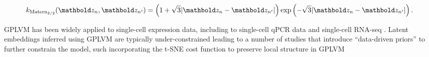 \begin{equation}
  k_{\text{Matern}_{3/2}}(\mbz_n, \mbz_{n'}) =
  \left(
  1 + \sqrt{3} \lvert \mbz_n - \mbz_{n'} \rvert \right) \exp\left( - \sqrt{3} \lvert \mbz_n - \mbz_{n'} \rvert \right).
\end{equation}

GPLVM has been widely applied to single-cell expression data, including to single-cell qPCR data \cite{buettner2012novel} and single-cell RNA-seq \cite{campbell2016order,macaulay2016single}. Latent embeddings inferred using GPLVM are typically under-constrained leading to a number of studies that introduce ``data-driven priors'' to further constrain the model, such incorporating the t-SNE cost function to preserve local structure in GPLVM \cite{van2009preserving}

